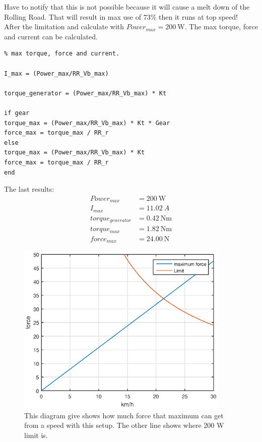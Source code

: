 Have to notify that this is not possible because it will cause a melt down of the Rolling Road. That will result in max use of $ 73 \% $ then it runs at top speed!\\

After the limitation and calculate with $ Power_{max} = \SI{200}{\watt} $. The max torque, force and current can be calculated.

\lstset{language=MATLAB}
\begin{lstlisting}
% max torque, force and current.

I_max = (Power_max/RR_Vb_max)

torque_generator = (Power_max/RR_Vb_max) * Kt

if gear
torque_max = (Power_max/RR_Vb_max) * Kt * Gear
force_max = torque_max / RR_r
else
torque_max = (Power_max/RR_Vb_max) * Kt
force_max = torque_max / RR_r
end
\end{lstlisting}

The last results:
\begin{equation}
\begin{split}
Power_{max} &= \SI{200}{\watt}\\
I_{max} &= \SI{11.02}{A}\\
torque_{generator} &= \SI{0.42}{\newton \metre}\\
torque_{max} &= \SI{1.82}{\newton \metre}\\
force_{max} &= \SI{24.00}{\newton}
\end{split}
\end{equation}

\begin{figure}[H]
	\centering
	\includegraphics [width=4in]{Hardware/Pictures/force.eps}
	\caption{This diagram give shows how much force that maximum can get from a speed with this setup. The other line shows where 200 W limit is.}
	\label{fig:Force_and_speed}
\end{figure}